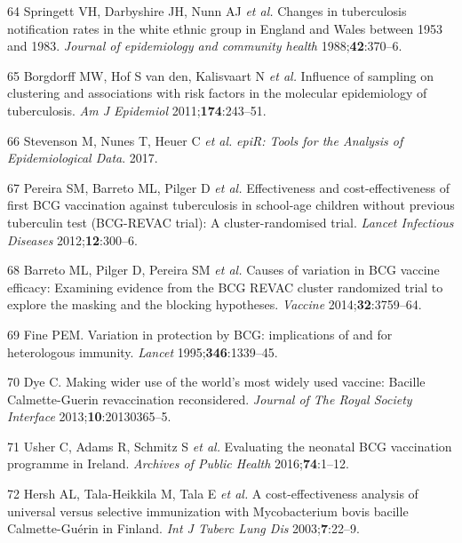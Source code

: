 \documentclass[11pt,twoside]{bristolthesis}
\begin{document}
  \leavevmode\hypertarget{ref-Springett1988}{}%
  64 Springett VH, Darbyshire JH, Nunn AJ \emph{et al.} Changes in tuberculosis notification rates in the white ethnic group in England and Wales between 1953 and 1983. \emph{Journal of epidemiology and community health} 1988;\textbf{42}:370--6.
  
  \leavevmode\hypertarget{ref-Borgdorff2011}{}%
  65 Borgdorff MW, Hof S van den, Kalisvaart N \emph{et al.} Influence of sampling on clustering and associations with risk factors in the molecular epidemiology of tuberculosis. \emph{Am J Epidemiol} 2011;\textbf{174}:243--51.
  
  \leavevmode\hypertarget{ref-EpiR}{}%
  66 Stevenson M, Nunes T, Heuer C \emph{et al.} \emph{epiR: Tools for the Analysis of Epidemiological Data}. 2017.
  
  \leavevmode\hypertarget{ref-Pereira2012}{}%
  67 Pereira SM, Barreto ML, Pilger D \emph{et al.} Effectiveness and cost-effectiveness of first BCG vaccination against tuberculosis in school-age children without previous tuberculin test (BCG-REVAC trial): A cluster-randomised trial. \emph{Lancet Infectious Diseases} 2012;\textbf{12}:300--6.
  
  \leavevmode\hypertarget{ref-Barreto2014a}{}%
  68 Barreto ML, Pilger D, Pereira SM \emph{et al.} Causes of variation in BCG vaccine efficacy: Examining evidence from the BCG REVAC cluster randomized trial to explore the masking and the blocking hypotheses. \emph{Vaccine} 2014;\textbf{32}:3759--64.
  
  \leavevmode\hypertarget{ref-Fine1995}{}%
  69 Fine PEM. Variation in protection by BCG: implications of and for heterologous immunity. \emph{Lancet} 1995;\textbf{346}:1339--45.
  
  \leavevmode\hypertarget{ref-Dye2013a}{}%
  70 Dye C. Making wider use of the world's most widely used vaccine: Bacille Calmette-Guerin revaccination reconsidered. \emph{Journal of The Royal Society Interface} 2013;\textbf{10}:20130365--5.
  
  \leavevmode\hypertarget{ref-Usher2016}{}%
  71 Usher C, Adams R, Schmitz S \emph{et al.} Evaluating the neonatal BCG vaccination programme in Ireland. \emph{Archives of Public Health} 2016;\textbf{74}:1--12.
  
  \leavevmode\hypertarget{ref-Hersh2003}{}%
  72 Hersh AL, Tala-Heikkila M, Tala E \emph{et al.} A cost-effectiveness analysis of universal versus selective immunization with Mycobacterium bovis bacille Calmette-Guérin in Finland. \emph{Int J Tuberc Lung Dis} 2003;\textbf{7}:22--9.
  
\end{document}
